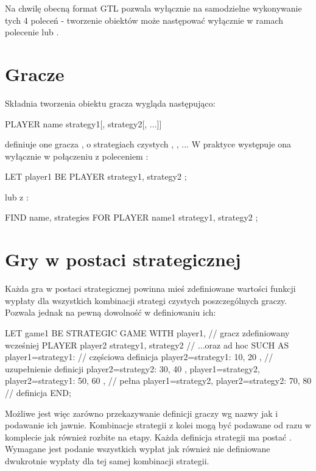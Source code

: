 \documentclass[polish]{standalone}
\begin{document}
Na chwilę obecną format GTL pozwala wyłącznie na samodzielne wykonywanie tych 4 poleceń - tworzenie obiektów może 
następować wyłącznie w ramach polecenie  lub .

\section{Gracze}

Składnia tworzenia obiektu gracza wygląda następująco:

\begin{code}
PLAYER name { strategy1[, strategy2[, ...]] }
\end{code}

definiuje one gracza , o strategiach czystych , , ... W praktyce występuje
ona wyłącznie w połączeniu z poleceniem :

\begin{code}
LET player1 BE PLAYER { strategy1, strategy2 };
\end{code}

lub z :

\begin{code}
FIND name, strategies FOR PLAYER name1 { strategy1, strategy2 };
\end{code}

\section{Gry w postaci strategicznej}

Każda gra w postaci strategicznej powinna mieś zdefiniowane wartości funkcji wypłaty dla wszystkich kombinacji strategi
czystych poszczególnych graczy. Pozwala jednak na pewną dowolność w definiowaniu ich:

\begin{code}
LET game1 BE
  STRATEGIC GAME
  WITH
    player1, // gracz zdefiniowany wcześniej
  	PLAYER player2 { strategy1, strategy2 } // ...oraz ad hoc
  SUCH AS
    { player1=strategy1: // częściowa definicja
  	  { player2=strategy1: 10, 20 }, // uzupełnienie definicji
  	  { player2=strategy2: 30, 40 }
    },
    { player1=strategy2, player2=strategy1: 50, 60 }, // pełna
    { player1=strategy2, player2=strategy2: 70, 80 }  // definicja
  END;
\end{code}

Możliwe jest więc zarówno przekazywanie definicji graczy wg nazwy jak i podawanie ich jawnie. Kombinacje strategii z
kolei mogą być podawane od razu w komplecie jak również rozbite na etapy. Każda definicja strategii ma postać
. Wymagane jest podanie
wszystkich wypłat jak również nie definiowane dwukrotnie wypłaty dla tej samej kombinacji strategii.
\end{document}
